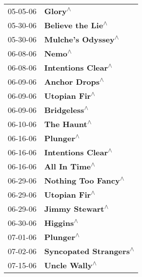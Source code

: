\begin{supertabular}{p{0.25\columnwidth}p{0.75\columnwidth}}
 05-05-06 &                                           \textbf{Glory\textsuperscript{$\wedge$}} \\
 05-30-06 &                                 \textbf{Believe the Lie\textsuperscript{$\wedge$}} \\
 05-30-06 &                                \textbf{Mulche's Odyssey\textsuperscript{$\wedge$}} \\
 06-08-06 &                                            \textbf{Nemo\textsuperscript{$\wedge$}} \\
 06-08-06 &                                \textbf{Intentions Clear\textsuperscript{$\wedge$}} \\
 06-09-06 &                                    \textbf{Anchor Drops\textsuperscript{$\wedge$}} \\
 06-09-06 &                                     \textbf{Utopian Fir\textsuperscript{$\wedge$}} \\
 06-09-06 &                                      \textbf{Bridgeless\textsuperscript{$\wedge$}} \\
 06-10-06 &                                       \textbf{The Haunt\textsuperscript{$\wedge$}} \\
 06-16-06 &                                         \textbf{Plunger\textsuperscript{$\wedge$}} \\
 06-16-06 &                                \textbf{Intentions Clear\textsuperscript{$\wedge$}} \\
 06-16-06 &                                     \textbf{All In Time\textsuperscript{$\wedge$}} \\
 06-29-06 &                               \textbf{Nothing Too Fancy\textsuperscript{$\wedge$}} \\
 06-29-06 &                                     \textbf{Utopian Fir\textsuperscript{$\wedge$}} \\
 06-29-06 &                                   \textbf{Jimmy Stewart\textsuperscript{$\wedge$}} \\
 06-30-06 &                                         \textbf{Higgins\textsuperscript{$\wedge$}} \\
 07-01-06 &                                         \textbf{Plunger\textsuperscript{$\wedge$}} \\
 07-02-06 &                            \textbf{Syncopated Strangers\textsuperscript{$\wedge$}} \\
 07-15-06 &                                     \textbf{Uncle Wally\textsuperscript{$\wedge$}} \\

\end{supertabular}
